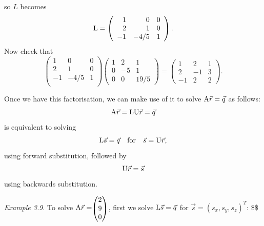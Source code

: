 \documentclass[
  letterpaper,
  DIV=11,
  numbers=noendperiod]{scrartcl}
\theoremstyle{remark}
\begin{document}
so \(L\) becomes \[{\rm L} = \left(\begin{array}{rrr}
 1  & 0  & 0  \\
 2  & 1  & 0  \\
 {-1}  & {-4/5}  & 1  
\end{array} \right).\] Now check that \[\left(\begin{array}{rrr}
 1  & 0  & 0  \\
 2  & 1  & 0  \\
 {-1}  & {-4/5}  & 1  \\
\end{array} \right)\left(\begin{array}{rrr}
 1  & 2  & 1  \\
 0  & {-5}  & 1  \\
 0  & 0  & {19/5}  
\end{array} \right)=\left(\begin{array}{rrr}
 1  & 2  & 1  \\
 2  & {-1}  & 3  \\
 {-1}  & 2  & 2  
\end{array} \right).\]

Once we have this factorisation, we can make use of it to solve
\({\rm A}\vec{r}=\vec{q}\) as follows:
\[{\rm A}\vec{r}={\rm L}{\rm U}\vec{r}=\vec{q}\] is equivalent to
solving
\[{\rm L}\vec{s}=\vec{q}\quad\textrm{for}\quad\vec{s}={\rm U}\vec{r},\]
using forward substitution, followed by \[{\rm U}\vec{r}=\vec{s}\] using
backwards substitution.

\emph{Example 3.9}. To solve
\({\rm A}\vec{r}= \scriptscriptstyle \begin{pmatrix}    2\\ 9 \\ 0  \end{pmatrix} \textstyle\),
first we solve \({\rm L}\vec{s}=\vec{q}\) for
\(\vec{s}=(s_{x},s_{y},s_{z})^{T}\): \$\$
\end{document}
